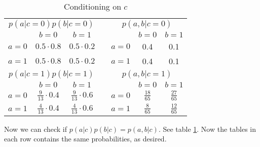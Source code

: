 \documentclass[12pt, a4paper]{article}
\numberwithin{equation}{section}
\begin{document}
\begin{table}[t]
\centering
\begin{tabular}{ccclccc}
\multicolumn{3}{c}{$p(a|c=0)p(b|c=0)$}                                                &                       & \multicolumn{3}{c}{$p(a,b|c=0)$}                                                     \\ \cline{2-3} \cline{6-7} 
\multicolumn{1}{c|}{}       & \multicolumn{1}{c|}{$b=0$}   & \multicolumn{1}{c|}{$b=1$}   &                       & \multicolumn{1}{c|}{}      & \multicolumn{1}{c|}{$b=0$}   & \multicolumn{1}{c|}{$b=1$}   \\ \cline{1-3} \cline{5-7} 
\multicolumn{1}{|c|}{$a=0$}   & \multicolumn{1}{c|}{$0.5\cdot 0.8$}      & \multicolumn{1}{c|}{$0.5\cdot 0.2$}      & \multicolumn{1}{l|}{} & \multicolumn{1}{c|}{$a=0$}   & \multicolumn{1}{c|}{0.4}      & \multicolumn{1}{c|}{0.1}      \\ \cline{1-3} \cline{5-7} 
\multicolumn{1}{|c|}{$a=1$}   & \multicolumn{1}{c|}{$0.5\cdot 0.8$}      & \multicolumn{1}{c|}{$0.5\cdot 0.2$}      & \multicolumn{1}{l|}{} & \multicolumn{1}{c|}{$a=1$}   & \multicolumn{1}{c|}{0.4}      & \multicolumn{1}{c|}{0.1}      \\ \cline{1-3} \cline{5-7} 
\multicolumn{3}{c}{$p(a|c=1)p(b|c=1)$}                                                & \multicolumn{1}{c}{}  & \multicolumn{3}{c}{$p(a,b|c=1)$}                                                     \\ \cline{2-3} \cline{6-7} 
\multicolumn{1}{c|}{}       & \multicolumn{1}{c|}{$b=0$} & \multicolumn{1}{c|}{$b=1$} & \multicolumn{1}{c}{}  & \multicolumn{1}{c|}{}      & \multicolumn{1}{c|}{$b=0$} & \multicolumn{1}{c|}{$b=1$} \\ \cline{1-3} \cline{5-7} 
\multicolumn{1}{|c|}{$a=0$} & \multicolumn{1}{c|}{$\frac{9}{13}\cdot 0.4$}      & \multicolumn{1}{c|}{$\frac{9}{13}\cdot 0.6$}      & \multicolumn{1}{c|}{} & \multicolumn{1}{c|}{$a=0$} & \multicolumn{1}{c|}{$\frac{18}{65}$}      & \multicolumn{1}{c|}{$\frac{27}{65}$}      \\ \cline{1-3} \cline{5-7} 
\multicolumn{1}{|c|}{$a=1$} & \multicolumn{1}{c|}{$\frac{4}{13}\cdot 0.4$}      & \multicolumn{1}{c|}{$\frac{4}{13}\cdot 0.6$}      & \multicolumn{1}{c|}{} & \multicolumn{1}{c|}{$a=1$} & \multicolumn{1}{c|}{$\frac{8}{65}$}      & \multicolumn{1}{c|}{$\frac{12}{65}$}      \\ \cline{1-3} \cline{5-7} 
\end{tabular}
\caption{Conditioning on $c$}
\label{table:e_83_conditional}
\end{table}

Now we can check if $p(a|c)p(b|c)=p(a,b|c)$. See table \ref{table:e_83_conditional}. Now the tables in each row contains the same probabilities, as desired.
\end{document}
